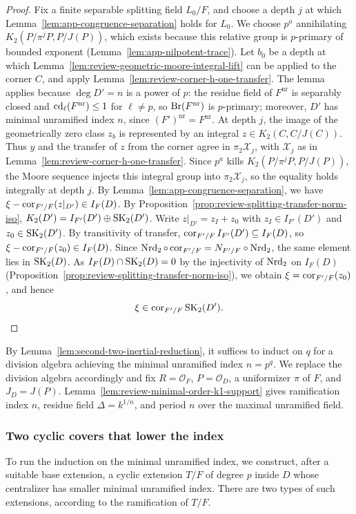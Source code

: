 \begin{proof}
Fix a finite separable splitting field $L_0/F$, and choose a depth $j$ at which Lemma~\ref{lem:app-congruence-separation} holds for $L_0$.
We choose $p^a$ annihilating $K_2(P/\pi^jP,P/J(P))$, which exists because this relative group is $p$-primary of bounded exponent (Lemma~\ref{lem:app-nilpotent-trace}).
Let $b_0$ be a depth at which Lemma~\ref{lem:review-geometric-moore-integral-lift} can be applied to the corner $C$, and apply Lemma~\ref{lem:review-corner-h-one-transfer}.
The lemma applies because $\deg D'=n$ is a power of $p$: the residue field of $F^{\mathrm{nr}}$ is separably closed and $\operatorname{cd}_\ell(F^{\mathrm{nr}})\le1$ for $\ell\ne p$, so $\operatorname{Br}(F^{\mathrm{nr}})$ is $p$-primary; moreover, $D'$ has minimal unramified index $n$, since $(F')^{\mathrm{nr}}=F^{\mathrm{nr}}$.
At depth $j$, the image of the geometrically zero class $z_b$ is represented by an integral $z\in K_2(C,C/J(C))$.
Thus $y$ and the transfer of $z$ from the corner agree in $\pi_2\mathcal X_j$, with $\mathcal X_j$ as in Lemma~\ref{lem:review-corner-h-one-transfer}.
Since $p^a$ kills $K_2(P/\pi^jP,P/J(P))$, the Moore sequence injects this integral group into $\pi_2\mathcal X_j$, so the equality holds integrally at depth $j$.
By Lemma~\ref{lem:app-congruence-separation}, we have $\xi-\operatorname{cor}_{F'/F}(z|_{D'})\in I_F(D)$.
By Proposition~\ref{prop:review-splitting-transfer-norm-iso}, $K_2(D')=I_{F'}(D')\oplus\operatorname{SK}_2(D')$.
Write $z|_{D'}=z_I+z_0$ with $z_I\in I_{F'}(D')$ and $z_0\in\operatorname{SK}_2(D')$.
By transitivity of transfer, $\operatorname{cor}_{F'/F}I_{F'}(D')\subseteq I_F(D)$, so $\xi-\operatorname{cor}_{F'/F}(z_0)\in I_F(D)$.
Since $\operatorname{Nrd}_2\circ\operatorname{cor}_{F'/F}=N_{F'/F}\circ\operatorname{Nrd}_2$, the same element lies in $\operatorname{SK}_2(D)$.
As $I_F(D)\cap\operatorname{SK}_2(D)=0$ by the injectivity of $\operatorname{Nrd}_2$ on $I_F(D)$ (Proposition~\ref{prop:review-splitting-transfer-norm-iso}), we obtain $\xi=\operatorname{cor}_{F'/F}(z_0)$, and hence
\[
 \xi\in\operatorname{cor}_{F'/F}\operatorname{SK}_2(D').
\]
\end{proof}

By Lemma~\ref{lem:second-two-inertial-reduction}, it suffices to induct on $q$ for a division algebra achieving the minimal unramified index $n=p^q$.
We replace the division algebra accordingly and fix $R=\mathcal O_F$, $P=\mathcal O_D$, a uniformizer $\pi$ of $F$, and $J_D=J(P)$.
Lemma~\ref{lem:review-minimal-order-k1-support} gives ramification index $n$, residue field $\Delta=k^{1/n}$, and period $n$ over the maximal unramified field.

\subsubsection{Two cyclic covers that lower the index}
To run the induction on the minimal unramified index, we construct, after a suitable base extension, a cyclic extension $T/F$ of degree $p$ inside $D$ whose centralizer has smaller minimal unramified index.
There are two types of such extensions, according to the ramification of $T/F$.

